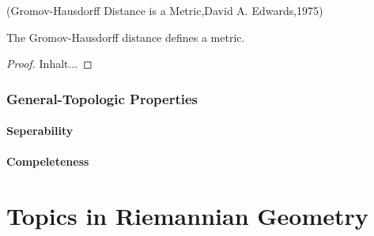 \documentclass[Total.tex]{subfiles}
\begin{document}
				\begin{theorem}
					(Gromov-Hausdorff Distance is a Metric,David A. Edwards,1975)
					
					 The Gromov-Hausdorff distance defines a metric.
				\end{theorem}
				\begin{proof}
					Inhalt...
				\end{proof}
			
			\subsection{General-Topologic Properties}
				\subsubsection{Seperability}
				\subsubsection{Compeleteness}
		\chapter{Topics in Riemannian Geometry}
\end{document}
